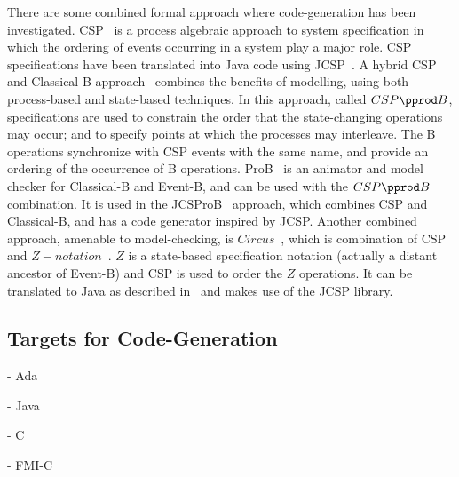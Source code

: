 There are some combined formal approach where code-generation has been investigated. CSP~\cite{HO85CSP,Roscoe1997} is a process algebraic approach to system specification in which the ordering of events occurring in a system play a major role. CSP specifications have been translated into Java code using JCSP~\cite{JCSPMulti, JCSPNet}. A hybrid CSP and Classical-B approach~\cite{SchneiderT02, SchneiderT05} combines the benefits of modelling, using both process-based and state-based techniques.  In this approach, called $CSP\pprod B$, specifications are used to constrain the order that the state-changing operations may occur; and to specify points at which the processes may interleave. The B operations synchronize with CSP events with the same name, and provide an ordering of the occurrence of B operations. ProB~\cite{LeuschelB08} is an animator and model checker for Classical-B and Event-B, and can be used with the $CSP\pprod B$ combination. It is used in the JCSProB~\cite{YangPop2007} approach, which combines CSP and Classical-B, and has a code generator inspired by JCSP. Another combined approach, amenable to model-checking, is $Circus$~\cite{WoodcockC01}, which is combination of CSP and $Z-notation$~\cite{Spivey89}. $Z$ is a state-based specification notation (actually a distant ancestor of Event-B) and CSP is used to order the $Z$ operations. It can be translated to Java as described in~\cite{FreitasC06} and makes use of the JCSP library.


\subsection{Targets for Code-Generation}

- Ada

- Java

- C

- FMI-C
